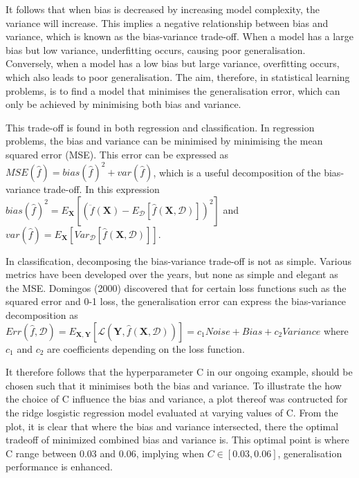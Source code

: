 \documentclass[11pt]{article}
\begin{document}
It follows that when bias is decreased by increasing model complexity,
the variance will increase. This implies a negative relationship between
bias and variance, which is known as the bias-variance trade-off. When a
model has a large bias but low variance, underfitting occurs, causing
poor generalisation. Conversely, when a model has a low bias but large
variance, overfitting occurs, which also leads to poor generalisation.
The aim, therefore, in statistical learning problems, is to find a model
that minimises the generalisation error, which can only be achieved by
minimising both bias and variance.

This trade-off is found in both regression and classification. In
regression problems, the bias and variance can be minimised by
minimising the mean squared error (MSE). This error can be expressed as
\(MSE(\hat{f})=bias(\hat{f})^2+var(\hat{f})\), which is a useful
decomposition of the bias-variance trade-off. In this expression
\(bias(\hat{f})^2 = E_{\mathbf{X}}\left[(\ddot{f}(\mathbf{X}) - E_{\mathcal{D}}[\hat{f}(\mathbf{X},\mathcal{D})])^2\right]\)
and
\(var(\hat{f}) = E_{\mathbf{X}}\left[Var_{\mathcal{D}}[\hat{f}(\mathbf{X},\mathcal{D})]\right]\).

In classification, decomposing the bias-variance trade-off is not as
simple. Various metrics have been developed over the years, but none as
simple and elegant as the MSE. Domingos (2000) discovered that for
certain loss functions such as the squared error and 0-1 loss, the
generalisation error can express the bias-variance decomposition as
\(Err(\hat{f},\mathcal{D})=E_{\mathbf{X,Y}}[\mathcal{L}(\mathbf{Y},\hat{f}(\mathbf{X},\mathcal{D}))]=c_1Noise+Bias+c_2Variance\)
where \(c_1\) and \(c_2\) are coefficients depending on the loss
function.

It therefore follows that the hyperparameter C in our ongoing example,
should be chosen such that it minimises both the bias and variance. To
illustrate the how the choice of C influence the bias and variance, a
plot thereof was contructed for the ridge losgistic regression model
evaluated at varying values of C. From the plot, it is clear that where
the bias and variance intersected, there the optimal tradeoff of
minimized combined bias and variance is. This optimal point is where C
range between 0.03 and 0.06, implying when \(C\in[0.03,0.06]\),
generalisation performance is enhanced.
\end{document}

